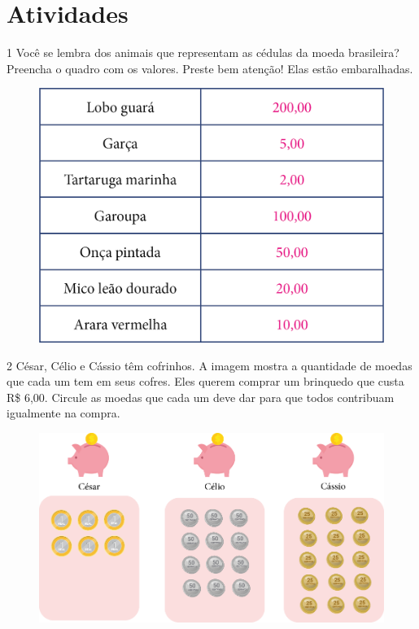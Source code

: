 \section*{Atividades}

\num{1} Você se lembra dos animais que representam as cédulas da moeda
brasileira? Preencha o quadro com os valores. Preste bem atenção!
Elas estão embaralhadas.

\begin{figure}[htpb!]
\centering
\includegraphics[width=.7\textwidth]{./media/image63.png}
\end{figure}


\pagebreak

\num{2} César, Célio e Cássio têm cofrinhos. A
imagem mostra a quantidade de moedas que cada um tem em
seus cofres. Eles querem comprar um brinquedo que custa R\$ 6,00.
Circule as moedas que cada um deve dar para que todos contribuam
igualmente na compra.

\begin{figure}[htpb!]
\centering
\includegraphics[width=.8\textwidth]{./media/image76.png}
\end{figure}

